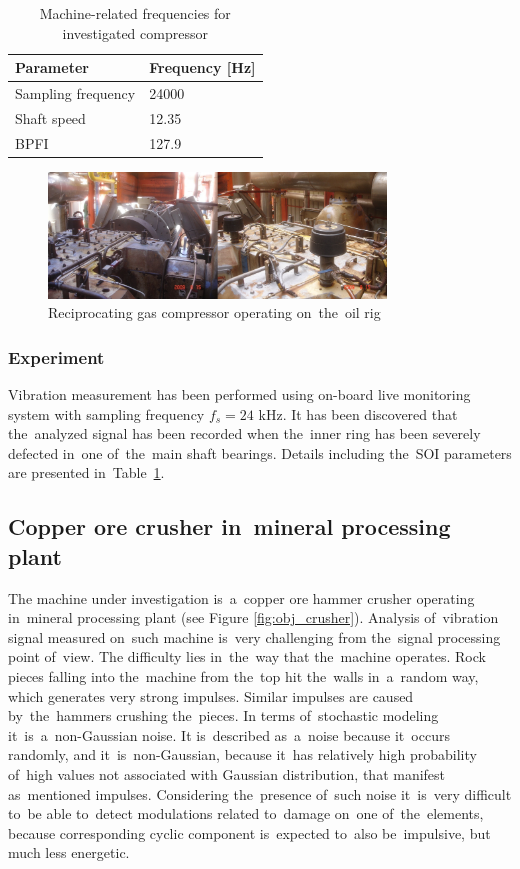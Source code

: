 \begin{table}[ht!]
  \centering
  \caption{Machine-related frequencies for investigated compressor}
  \begin{tabular}{|l|l|}
  \hline
     \textbf{Parameter} & \textbf{Frequency [Hz]} \\ \hline
     Sampling frequency & 24000 \\ \hline
     Shaft speed & 12.35 \\ \hline
     BPFI & 127.9 \\ 
  \hline
  \end{tabular}
  \label{tab:tab1}
\end{table}

\begin{figure}[ht!]
\centering
\includegraphics[width=0.8\textwidth]{wykresy/obj_komp.png}
\caption{Reciprocating gas compressor operating on~the~oil rig}
\label{fig:obj_komp}
\end{figure}

\subsubsection{Experiment}

Vibration measurement has been performed using on-board live monitoring system with sampling frequency $f_s=24$ kHz. It has been discovered that the~analyzed signal has been recorded when the~inner ring has been severely defected in~one of~the~main shaft bearings. Details including the~SOI parameters are presented in~Table~\ref{tab:tab1}.

\subsection{Copper ore crusher in~mineral processing plant}

The machine under investigation is~a~copper ore hammer crusher operating in~mineral processing plant (see Figure \ref{fig:obj_crusher}). Analysis of~vibration signal measured on~such machine is~very challenging from the~signal processing point of~view. The difficulty lies in~the~way that the~machine operates. Rock pieces falling into the~machine from the~top hit the~walls in~a~random way, which generates very strong impulses. Similar impulses are caused by~the~hammers crushing the~pieces. In terms of~stochastic modeling it~is~a~non-Gaussian noise. It is~described as~a~noise because it~occurs randomly, and it~is~non-Gaussian, because it~has relatively high probability of~high values not associated with Gaussian distribution, that manifest as~mentioned impulses. Considering the~presence of~such noise it~is~very difficult to~be able to~detect modulations related to~damage on~one of~the~elements, because corresponding cyclic component is~expected to~also be~impulsive, but much less energetic.

